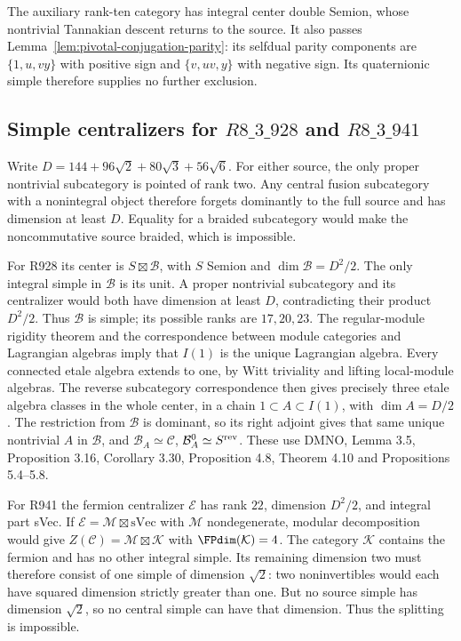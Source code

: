 The auxiliary rank-ten category has integral center double Semion,
whose nontrivial Tannakian descent returns to the source. It also passes
Lemma~\ref{lem:pivotal-conjugation-parity}: its selfdual parity components
are $\{1,u,vy\}$ with positive sign and $\{v,uv,y\}$ with negative
sign. Its quaternionic simple therefore supplies no further exclusion.

\subsection{Simple centralizers for $R8\_3\_928$ and $R8\_3\_941$}
Write $D=144+96\sqrt2+80\sqrt3+56\sqrt6$.
For either source, the only proper nontrivial subcategory is pointed of
rank two. Any central fusion subcategory with a nonintegral object
therefore forgets dominantly to the full source and has dimension at
least $D$. Equality for a braided subcategory would make the noncommutative
source braided, which is impossible.

For R928 its center is $S\boxtimes\mathcal B$, with $S$ Semion and
$\dim\mathcal B=D^2/2$. The only integral simple in $\mathcal B$ is its
unit. A proper nontrivial subcategory and its centralizer would both have
dimension at least $D$, contradicting their product $D^2/2$.
Thus $\mathcal B$ is simple; its possible ranks are $17,20,23$.
The regular-module rigidity theorem and the correspondence between module
categories and Lagrangian algebras imply that $I(1)$ is the unique
Lagrangian algebra. Every connected etale algebra extends to one, by
Witt triviality and lifting local-module algebras. The reverse subcategory
correspondence then gives precisely three etale algebra classes in the
whole center, in a chain $1\subset A\subset I(1)$, with $\dim A=D/2$.
The restriction from $\mathcal B$ is dominant, so its right adjoint gives
that same unique nontrivial $A$ in $\mathcal B$, and
$\mathcal B_A\simeq\mathcal C$, $\mathcal B_A^0\simeq S^{\rm rev}$.
These use DMNO, Lemma 3.5, Proposition 3.16, Corollary 3.30,
Proposition 4.8, Theorem 4.10 and Propositions 5.4--5.8.

For R941 the fermion centralizer $\mathcal E$ has rank $22$, dimension
$D^2/2$, and integral part sVec. If
$\mathcal E=\mathcal M\boxtimes\mathrm{sVec}$ with $\mathcal M$
nondegenerate, modular decomposition would give
$Z(\mathcal C)=\mathcal M\boxtimes\mathcal K$ with
$\FPdim(\mathcal K)=4$. The category $\mathcal K$ contains the fermion
and has no other integral simple. Its remaining dimension two must
therefore consist of one simple of dimension $\sqrt2$: two noninvertibles
would each have squared dimension strictly greater than one. But no
source simple has dimension $\sqrt2$, so no central simple can have
that dimension. Thus the splitting is impossible.

